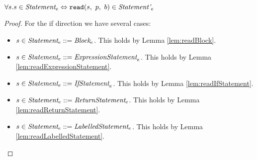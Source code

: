 \documentclass[preprint,10pt]{sigplanconf}
\begin{document}
\begin{lemma}\mbox{}
  
  \( \forall s. s \in \textit{Statement}_{e} \Leftrightarrow 
  \texttt{read}(s,~p,~b) \in \textit{Statement'}_{e} \)
\end{lemma}
\begin{proof}
  For the if direction we have several cases:
  \begin{itemize}
  \item \( s \in \textit{Statement}_{e} ::= \textit{Block}_{e} \). This
    holds by Lemma \ref{lem:readBlock}.

  \item \( s \in \textit{Statement}_{e} ::= \textit{ExpressionStatement}_{e} \). This
    holds by Lemma \ref{lem:readExpressionStatement}.

  \item \( s \in \textit{Statement}_{e} ::= \textit{IfStatement}_{e} \). This
    holds by Lemma \ref{lem:readIfStatement}.

  \item \( s \in \textit{Statement}_{e} ::= \textit{ReturnStatement}_{e} \). This
    holds by Lemma \ref{lem:readReturnStatement}.

  \item \( s \in \textit{Statement}_{e} ::= \textit{LabelledStatement}_{e} \). This
    holds by Lemma \ref{lem:readLabelledStatement}.
  \end{itemize}
\end{proof}
\end{document}
